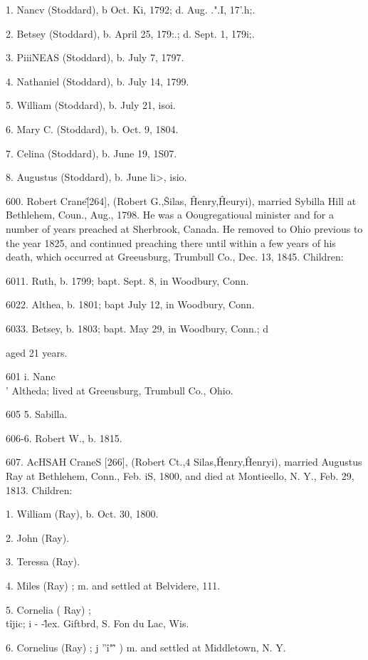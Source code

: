 1. Nancv (Stoddard), b Oct. Ki, 1792; d. Aug. .".I, 17'.h;. 

2. Betsey (Stoddard), b. April 25, 179:.; d. Sept. 1, 179i;. 

3. PiiiNEAS (Stoddard), b. July 7, 1797. 

4. Nathaniel (Stoddard), b. July 14, 1799. 

5. William (Stoddard), b. July 21, isoi. 

6. Mary C. (Stoddard), b. Oct. 9, 1804. 

7. Celina (Stoddard), b. June 19, 1S07. 

8. Augustus (Stoddard), b. June li>, isio. 




600. Robert Crane\^ [264], (Robert G.,\^ Silas, \^ Henry,\^ 
Heuryi), married Sybilla Hill at Bethlehem, Coun., Aug., 1798. 
He was a Oougregatioual minister and for a number of years 
preached at Sherbrook, Canada. He removed to Ohio previous 
to the year 1825, and continued preaching there until within a 
few years of his death, which occurred at Greeusburg, Trumbull 
Co., Dec. 13, 1845. Children: 

6011. Ruth, b. 1799; bapt. Sept. 8, in Woodbury, Conn. 

6022. Althea, b. 1801; bapt July 12, in Woodbury, Conn. 

6033. Betsey, b. 1803; bapt. May 29, in Woodbury, Conn.; d 

aged 21 years. 

601 i. Nanc\\' Altheda; lived at Greeusburg, Trumbull Co., Ohio. 

605  5. Sabilla. 

606-6. Robert W., b. 1815. 



607. AcHSAH CraneS [266], (Robert Ct.,4 Silas,\^ Henry,\^ 
Henryi), married Augustus Ray at Bethlehem, Conn., Feb. iS, 
1800, and died at Montieello, N. Y., Feb. 29, 1813. Children: 

1. William (Ray), b. Oct. 30, 1800. 

2. John (Ray). 

3. Teressa (Ray). 

4. Miles (Ray) ; m. and settled at Belvidere, 111. 

5. Cornelia ( Ray) ; \\ t\^ijic; i - -\^lex. Giftbrd, S. Fon du Lac, Wis. 

6. Cornelius (Ray) ; j ''\^i"\^' ) m. and settled at Middletown, N. Y. 

